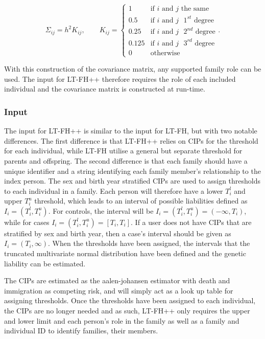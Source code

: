 \begin{equation*}
\Sigma_{ij} = h^2K_{ij}, \qquad K_{ij} = 
\begin{cases} 
1 		& \text{if } i \text{ and } j \text{ the same} \\
0.5 	& \text{if } i \text{ and } j \text{ $1^{st}$ degree} \\
0.25 	& \text{if } i \text{ and } j \text{ $2^{nd}$ degree} \\ 
0.125 	& \text{if } i \text{ and } j \text{ $3^{rd}$ degree}  \\
0 		& \text{otherwise}
\end{cases}.
\end{equation*}

With this construction of the covariance matrix, any supported family role can be used. The input for LT-FH++ therefore requires the role of each included individual and the covariance matrix is constructed at run-time. 

\subsubsection{Input}
The input for LT-FH++ is similar to the input for LT-FH, but with two notable differences. The first difference is that LT-FH++ relies on CIPs for the threshold for each individual, while LT-FH utilise a general but separate threshold for parents and offspring. The second difference is that each family should have a unique identifier and a string identifying each family member's relationship to the index person. The sex and birth year stratified CIPs are used to assign thresholds to each individual in a family. Each person will therefore have a lower $ T_i^l $ and upper $ T_i^u $ threshold, which leads to an interval of possible liabilities defined as $ I_i = (T_i^l, T_i^u) $. For controls, the interval will be $ I_i = (T_i^l,T_i^u) = (-\infty, T_i) $, while for cases $ I_i = (T_i^l,T_i^u) = [T_i,T_i] $. If a user does not have CIPs that are stratified by sex and birth year, then a case's interval should be given as $ I_i = (T_i, \infty) $. When the thresholds have been assigned, the intervals that the truncated multivariate normal distribution have been defined and the genetic liability can be estimated. 

The CIPs are estimated as the aalen-johansen estimator with death and immigration as competing risk, and will simply act as a look up table for assigning thresholds. Once the thresholds have been assigned to each individual, the CIPs are no longer needed and as such, LT-FH++ only requires the upper and lower limit and each person's role in the family as well as a family and individual ID to identify families, their members. 


